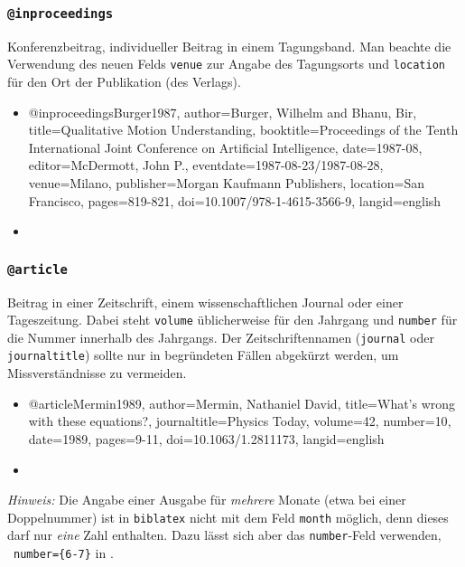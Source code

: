 
\subsubsection{\texttt{\bfseries @inproceedings}}
\label{sec:@inproceedings}

Konferenzbeitrag, individueller Beitrag in einem Tagungsband. Man beachte die Verwendung des neuen Felds
\texttt{venue} zur Angabe des Tagungsorts und \texttt{location} für den Ort der Publikation (des Verlags).
%
\begin{itemize}
\item[]
\begin{GenericCode}[numbers=none]
@inproceedings{Burger1987,
  author={Burger, Wilhelm and Bhanu, Bir},
  title={Qualitative Motion Understanding},
  booktitle={Proceedings of the Tenth International Joint Conference on Artificial Intelligence},
  date={1987-08},
  editor={McDermott, John P.},
  eventdate={1987-08-23/1987-08-28},
  venue={Milano},
  publisher={Morgan Kaufmann Publishers},
  location={San Francisco},
  pages={819-821},
  doi={10.1007/978-1-4615-3566-9},
  langid={english}
}
\end{GenericCode}
\item[\cite{Burger1987}] 
\end{itemize}


\subsubsection{\texttt{\bfseries @article}}
\label{sec:@article}

Beitrag in einer Zeitschrift, einem wissenschaftlichen Journal oder einer Tageszeitung. Dabei steht \texttt{volume}
üblicherweise für den Jahrgang und \texttt{number} für die Nummer innerhalb des Jahrgangs. Der Zeitschriftennamen
(\texttt{journal} oder \texttt{journaltitle}) sollte nur in begründeten Fällen abgekürzt werden, um Missverständnisse
zu vermeiden.
%
\begin{itemize}
\item[]
\begin{GenericCode}[numbers=none]
@article{Mermin1989,
  author={Mermin, Nathaniel David},
  title={What's wrong with these equations?},
  journaltitle={Physics Today},
  volume={42},
  number={10},
  date={1989},
  pages={9-11},
	doi={10.1063/1.2811173},
  langid={english}
}
\end{GenericCode}
\item[\cite{Mermin1989}] 
\end{itemize}
%
\emph{Hinweis:} Die Angabe einer Ausgabe für \emph{mehrere} Monate (etwa bei einer Doppelnummer) ist in
\texttt{biblatex} nicht mit dem Feld \texttt{month} möglich, denn dieses darf nur \emph{eine} Zahl enthalten. Dazu
lässt sich aber das \texttt{number}-Feld verwenden, \zB\ \texttt{number=\{6-7\}} in \cite{Vardavoulia2001}.

